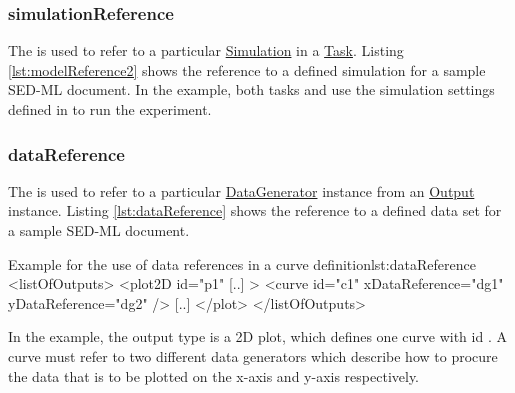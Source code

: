 \subsubsection{simulationReference}
\label{sec:simulationReference}
The  is used to refer to a particular \hyperref[class:simulation]{Simulation} in a \hyperref[class:task]{Task}. 
Listing \ref{lst:modelReference2} shows the reference to a defined simulation for a sample SED-ML document. In the example, both tasks  and  use the simulation settings defined in  to run the experiment.

\subsubsection{dataReference}
\label{sec:dataReference}
The  is used to refer to a particular \hyperref[class:dataGenerator]{DataGenerator} instance from an \hyperref[class:output]{Output} instance. 
Listing \ref{lst:dataReference} shows the reference to a defined data set for a sample SED-ML document. 
%
\begin{myXmlLst}{Example for the use of data references in a curve definition}{lst:dataReference}
<listOfOutputs>
  <plot2D id="p1" [..] >
    <curve id="c1" xDataReference="dg1" yDataReference="dg2" />
    [..]
  </plot>
</listOfOutputs>
\end{myXmlLst}
%
In the example, the output type is a 2D plot, which defines one curve with id . A curve must refer to two different data generators which describe how to procure the data that is to be plotted on the x-axis and y-axis respectively. 



